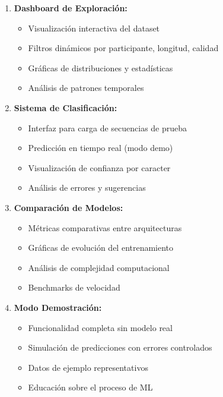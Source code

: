 \documentclass[12pt,a4paper]{article}
\begin{document}
\begin{enumerate}
    \item \textbf{Dashboard de Exploración:}
    \begin{itemize}
        \item Visualización interactiva del dataset
        \item Filtros dinámicos por participante, longitud, calidad
        \item Gráficas de distribuciones y estadísticas
        \item Análisis de patrones temporales
    \end{itemize}
    
    \item \textbf{Sistema de Clasificación:}
    \begin{itemize}
        \item Interfaz para carga de secuencias de prueba
        \item Predicción en tiempo real (modo demo)
        \item Visualización de confianza por caracter
        \item Análisis de errores y sugerencias
    \end{itemize}
    
    \item \textbf{Comparación de Modelos:}
    \begin{itemize}
        \item Métricas comparativas entre arquitecturas
        \item Gráficas de evolución del entrenamiento
        \item Análisis de complejidad computacional
        \item Benchmarks de velocidad
    \end{itemize}
    
    \item \textbf{Modo Demostración:}
    \begin{itemize}
        \item Funcionalidad completa sin modelo real
        \item Simulación de predicciones con errores controlados
        \item Datos de ejemplo representativos
        \item Educación sobre el proceso de ML
    \end{itemize}
\end{enumerate}
\end{document}

